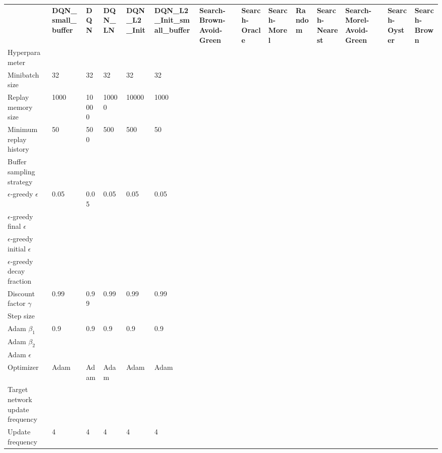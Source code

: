 \begin{tabular}{llllllllllllll}
 & \bfseries DQN_small_buffer & \bfseries DQN & \bfseries DQN_LN & \bfseries DQN_L2_Init & \bfseries DQN_L2_Init_small_buffer & \bfseries Search-Brown-Avoid-Green & \bfseries Search-Oracle & \bfseries Search-Morel & \bfseries Random & \bfseries Search-Nearest & \bfseries Search-Morel-Avoid-Green & \bfseries Search-Oyster & \bfseries Search-Brown \\
Hyperparameter &  &  &  &  &  &  &  &  &  &  &  &  &  \\
Minibatch size & 32 & 32 & 32 & 32 & 32 &  &  &  &  &  &  &  &  \\
Replay memory size & 1000 & 10000 & 10000 & 10000 & 1000 &  &  &  &  &  &  &  &  \\
Minimum replay history & 50 & 500 & 500 & 500 & 50 &  &  &  &  &  &  &  &  \\
Buffer sampling strategy &  &  &  &  &  &  &  &  &  &  &  &  &  \\
$\epsilon$-greedy $\epsilon$ & 0.05 & 0.05 & 0.05 & 0.05 & 0.05 &  &  &  &  &  &  &  &  \\
$\epsilon$-greedy final $\epsilon$ &  &  &  &  &  &  &  &  &  &  &  &  &  \\
$\epsilon$-greedy initial $\epsilon$ &  &  &  &  &  &  &  &  &  &  &  &  &  \\
$\epsilon$-greedy decay fraction &  &  &  &  &  &  &  &  &  &  &  &  &  \\
Discount factor $\gamma$ & 0.99 & 0.99 & 0.99 & 0.99 & 0.99 &  &  &  &  &  &  &  &  \\
Step size &  &  &  &  &  &  &  &  &  &  &  &  &  \\
Adam $\beta_1$ & 0.9 & 0.9 & 0.9 & 0.9 & 0.9 &  &  &  &  &  &  &  &  \\
Adam $\beta_2$ &  &  &  &  &  &  &  &  &  &  &  &  &  \\
Adam $\epsilon$ &  &  &  &  &  &  &  &  &  &  &  &  &  \\
Optimizer & Adam & Adam & Adam & Adam & Adam &  &  &  &  &  &  &  &  \\
Target network update frequency &  &  &  &  &  &  &  &  &  &  &  &  &  \\
Update frequency & 4 & 4 & 4 & 4 & 4 &  &  &  &  &  &  &  &  \\
\end{tabular}
